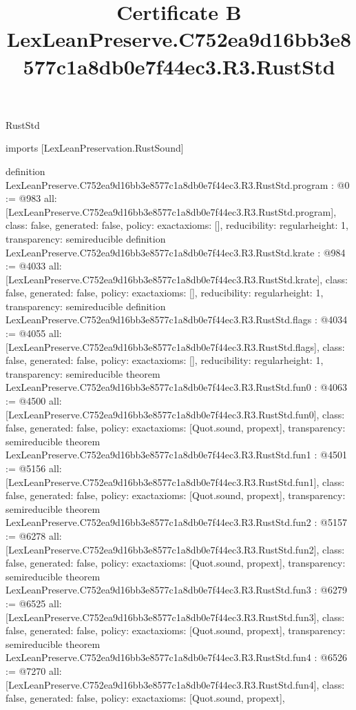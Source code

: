 \begin{lexlean}{RustStd}
\title{Certificate B LexLeanPreserve.C752ea9d16bb3e8577c1a8db0e7f44ec3.R3.RustStd}
\begin{coremodule}
imports [LexLeanPreservation.RustSound]

definition LexLeanPreserve.C752ea9d16bb3e8577c1a8db0e7f44ec3.R3.RustStd.program : @0 := @983 {
  all: [LexLeanPreserve.C752ea9d16bb3e8577c1a8db0e7f44ec3.R3.RustStd.program],
  class: false,
  generated: false,
  policy: exact{axioms: []},
  reducibility: regular{height: 1},
  transparency: semireducible
}
definition LexLeanPreserve.C752ea9d16bb3e8577c1a8db0e7f44ec3.R3.RustStd.krate : @984 := @4033 {
  all: [LexLeanPreserve.C752ea9d16bb3e8577c1a8db0e7f44ec3.R3.RustStd.krate],
  class: false,
  generated: false,
  policy: exact{axioms: []},
  reducibility: regular{height: 1},
  transparency: semireducible
}
definition LexLeanPreserve.C752ea9d16bb3e8577c1a8db0e7f44ec3.R3.RustStd.flags : @4034 := @4055 {
  all: [LexLeanPreserve.C752ea9d16bb3e8577c1a8db0e7f44ec3.R3.RustStd.flags],
  class: false,
  generated: false,
  policy: exact{axioms: []},
  reducibility: regular{height: 1},
  transparency: semireducible
}
theorem LexLeanPreserve.C752ea9d16bb3e8577c1a8db0e7f44ec3.R3.RustStd.fun0 : @4063 := @4500 {
  all: [LexLeanPreserve.C752ea9d16bb3e8577c1a8db0e7f44ec3.R3.RustStd.fun0],
  class: false,
  generated: false,
  policy: exact{axioms: [Quot.sound, propext]},
  transparency: semireducible
}
theorem LexLeanPreserve.C752ea9d16bb3e8577c1a8db0e7f44ec3.R3.RustStd.fun1 : @4501 := @5156 {
  all: [LexLeanPreserve.C752ea9d16bb3e8577c1a8db0e7f44ec3.R3.RustStd.fun1],
  class: false,
  generated: false,
  policy: exact{axioms: [Quot.sound, propext]},
  transparency: semireducible
}
theorem LexLeanPreserve.C752ea9d16bb3e8577c1a8db0e7f44ec3.R3.RustStd.fun2 : @5157 := @6278 {
  all: [LexLeanPreserve.C752ea9d16bb3e8577c1a8db0e7f44ec3.R3.RustStd.fun2],
  class: false,
  generated: false,
  policy: exact{axioms: [Quot.sound, propext]},
  transparency: semireducible
}
theorem LexLeanPreserve.C752ea9d16bb3e8577c1a8db0e7f44ec3.R3.RustStd.fun3 : @6279 := @6525 {
  all: [LexLeanPreserve.C752ea9d16bb3e8577c1a8db0e7f44ec3.R3.RustStd.fun3],
  class: false,
  generated: false,
  policy: exact{axioms: [Quot.sound, propext]},
  transparency: semireducible
}
theorem LexLeanPreserve.C752ea9d16bb3e8577c1a8db0e7f44ec3.R3.RustStd.fun4 : @6526 := @7270 {
  all: [LexLeanPreserve.C752ea9d16bb3e8577c1a8db0e7f44ec3.R3.RustStd.fun4],
  class: false,
  generated: false,
  policy: exact{axioms: [Quot.sound, propext]},
}
\end{coremodule}
\end{lexlean}
